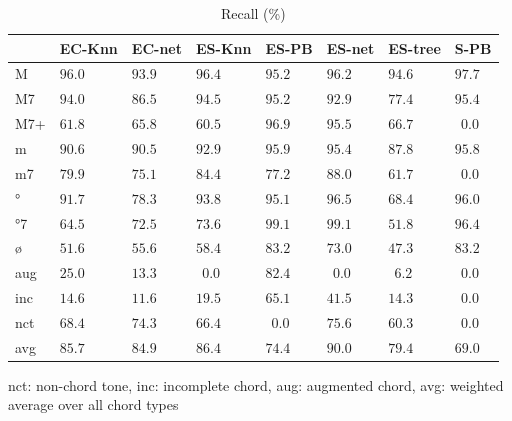 \documentclass{article}
\begin{document}
\begin{table}
  \centering
  \begin{tabular}{l|p{.5cm}p{.5cm}p{.5cm}p{.5cm}p{.5cm}p{.5cm}p{.5cm}}

   &EC-Knn&EC-net &ES-Knn &ES-PB  &ES-net &ES-tree&S-PB   \\
\hline                                            
M  &$96.0$&$ 93.9$&$ 96.4$&$ 95.2$&$ 96.2$&$ 94.6$&$ 97.7$ \\
M7 &$94.0$&$ 86.5$&$ 94.5$&$ 95.2$&$ 92.9$&$ 77.4$&$ 95.4$ \\
M7+&$61.8$&$ 65.8$&$ 60.5$&$ 96.9$&$ 95.5$&$ 66.7$&$~~0.0$ \\
m  &$90.6$&$ 90.5$&$ 92.9$&$ 95.9$&$ 95.4$&$ 87.8$&$ 95.8$ \\
m7 &$79.9$&$ 75.1$&$ 84.4$&$ 77.2$&$ 88.0$&$ 61.7$&$~~0.0$ \\
°  &$91.7$&$ 78.3$&$ 93.8$&$ 95.1$&$ 96.5$&$ 68.4$&$ 96.0$ \\
°7 &$64.5$&$ 72.5$&$ 73.6$&$ 99.1$&$ 99.1$&$ 51.8$&$ 96.4$ \\
ø  &$51.6$&$ 55.6$&$ 58.4$&$ 83.2$&$ 73.0$&$ 47.3$&$ 83.2$ \\
aug&$25.0$&$ 13.3$&$~~0.0$&$ 82.4$&$~~0.0$&$~~6.2$&$~~0.0$ \\
inc&$14.6$&$ 11.6$&$ 19.5$&$ 65.1$&$ 41.5$&$ 14.3$&$~~0.0$ \\
nct&$68.4$&$ 74.3$&$ 66.4$&$~~0.0$&$ 75.6$&$ 60.3$&$~~0.0$ \\
avg&$85.7$&$ 84.9$&$ 86.4$&$ 74.4$&$ 90.0$&$ 79.4$&$ 69.0$ \\
  \end{tabular}                                                        

\medskip

nct: non-chord tone, inc: incomplete chord, aug: augmented chord, avg:
weighted average over all chord types
  \caption{Recall (\%)}
  \label{tab:recall}
\end{table}
\end{document}
